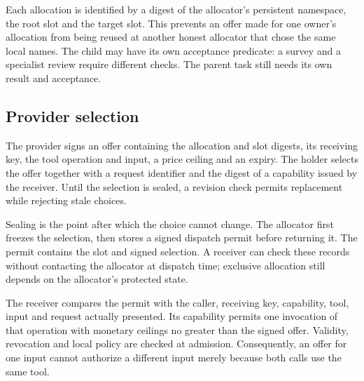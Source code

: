 Each allocation is identified by a digest of the allocator's persistent
namespace, the root slot and the target slot. This prevents an offer made for
one owner's allocation from being reused at another honest allocator that chose
the same local names. The child may have its own acceptance predicate: a survey
and a specialist review require different checks. The parent task still needs
its own result and acceptance.

\subsection{Provider selection}
The provider signs an offer containing the allocation and slot digests, its
receiving key, the tool operation and input, a price ceiling and an expiry.
The holder selects the offer together with a request identifier and the digest
of a capability issued by the receiver. Until the selection is sealed, a revision
check permits replacement while rejecting stale choices.

Sealing is the point after which the choice cannot change. The allocator first
freezes the selection, then stores a signed dispatch permit before returning
it. The permit contains the slot and signed selection. A receiver can check
these records without contacting the allocator at dispatch time; exclusive
allocation still depends on the allocator's protected state.

The receiver compares the permit with the caller, receiving key, capability,
tool, input and request actually presented. Its capability permits one invocation
of that operation with monetary ceilings no greater than the signed offer.
Validity, revocation and local policy are checked at admission. Consequently,
an offer for one input cannot authorize a different input merely because both
calls use the same tool.

